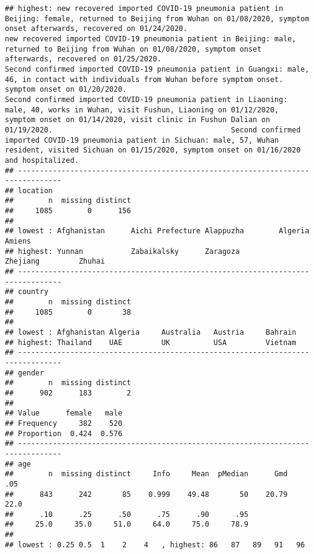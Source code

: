 \documentclass[
]{article}
\begin{document}
\begin{verbatim}
## highest: new recovered imported COVID-19 pneumonia patient in Beijing: female, returned to Beijing from Wuhan on 01/08/2020, symptom onset afterwards, recovered on 01/24/2020.                                                                              new recovered imported COVID-19 pneumonia patient in Beijing: male, returned to Beijing from Wuhan on 01/08/2020, symptom onset afterwards, recovered on 01/25/2020.                                                                                Second confirmed imported COVID-19 pneumonia patient in Guangxi: male, 46, in contact with individuals from Wuhan before symptom onset. symptom onset on 01/20/2020.                                                                                Second confirmed imported COVID-19 pneumonia patient in Liaoning: male, 40, works in Wuhan, visit Fushun, Liaoning on 01/12/2020, symptom onset on 01/14/2020, visit clinic in Fushun Dalian on 01/19/2020.                                         Second confirmed imported COVID-19 pneumonia patient in Sichuan: male, 57, Wuhan resident, visited Sichuan on 01/15/2020, symptom onset on 01/16/2020 and hospitalized.                                                                            
## --------------------------------------------------------------------------------
## location 
##        n  missing distinct 
##     1085        0      156 
## 
## lowest : Afghanistan      Aichi Prefecture Alappuzha        Algeria          Amiens          
## highest: Yunnan           Zabaikalsky      Zaragoza         Zhejiang         Zhuhai          
## --------------------------------------------------------------------------------
## country 
##        n  missing distinct 
##     1085        0       38 
## 
## lowest : Afghanistan Algeria     Australia   Austria     Bahrain    
## highest: Thailand    UAE         UK          USA         Vietnam    
## --------------------------------------------------------------------------------
## gender 
##        n  missing distinct 
##      902      183        2 
##                         
## Value      female   male
## Frequency     382    520
## Proportion  0.424  0.576
## --------------------------------------------------------------------------------
## age 
##        n  missing distinct     Info     Mean  pMedian      Gmd      .05 
##      843      242       85    0.999    49.48       50    20.79     22.0 
##      .10      .25      .50      .75      .90      .95 
##     25.0     35.0     51.0     64.0     75.0     78.9 
## 
## lowest : 0.25 0.5  1    2    4   , highest: 86   87   89   91   96  

\end{verbatim}
\end{document}
